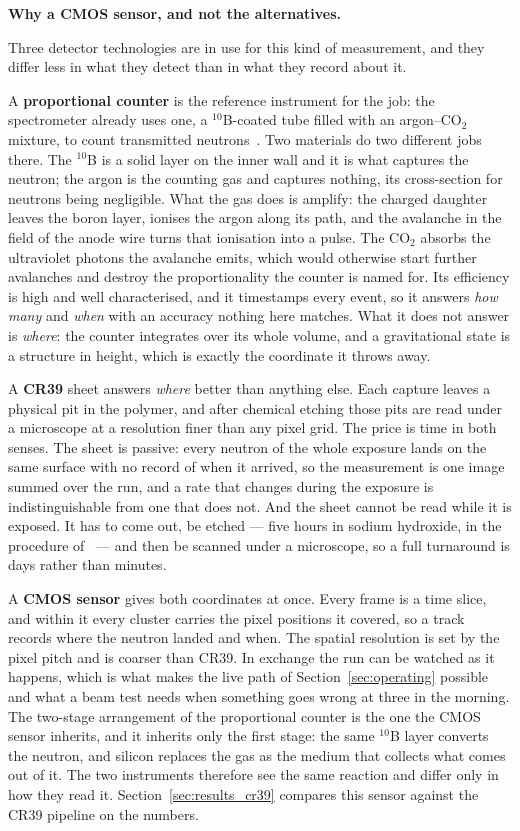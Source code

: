 \documentclass[a4paper,headsepline,oneside,11pt]{scrartcl}
\begin{document}
\vspace{0.5em}
\textbf{Why a CMOS sensor, and not the alternatives.}

Three detector technologies are in use for this kind of measurement, and they
differ less in what they detect than in what they record about it.

A \textbf{proportional counter} is the reference instrument for the job: the
spectrometer already uses one, a $^{10}$B-coated tube filled with an
argon--CO$_2$ mixture, to count transmitted
neutrons~\cite{Jenke2013detectors}. Two materials do two different jobs there.
The $^{10}$B is a solid layer on the inner wall and it is what captures the
neutron; the argon is the counting gas and captures nothing, its cross-section
for neutrons being negligible. What the gas does is amplify: the charged
daughter leaves the boron layer, ionises the argon along its path, and the
avalanche in the field of the anode wire turns that ionisation into a pulse. The
CO$_2$ absorbs the ultraviolet photons the avalanche emits, which would
otherwise start further avalanches and destroy the proportionality the counter
is named for. Its efficiency is high and
well characterised, and it timestamps every event, so it answers \emph{how many}
and \emph{when} with an accuracy nothing here matches. What it does not answer
is \emph{where}: the counter integrates over its whole volume, and a
gravitational state is a structure in height, which is exactly the coordinate it
throws away.

A \textbf{CR39} sheet answers \emph{where} better than anything else. Each
capture leaves a physical pit in the polymer, and after chemical etching those
pits are read under a microscope at a resolution finer than any pixel grid.
The price is time in both senses. The sheet is passive: every neutron of the
whole exposure lands on the same surface with no record of when it arrived, so
the measurement is one image summed over the run, and a rate that changes during
the exposure is indistinguishable from one that does not. And the sheet cannot
be read while it is exposed. It has to come out, be etched --- five hours in
sodium hydroxide, in the procedure of~\cite{Filter2018} --- and then be scanned
under a microscope, so a full turnaround is days rather than minutes.

A \textbf{CMOS sensor} gives both coordinates at once. Every frame is a time
slice, and within it every cluster carries the pixel positions it covered, so a
track records where the neutron landed and when. The spatial resolution is set
by the pixel pitch and is coarser than CR39. In exchange the run can be watched
as it happens, which is what makes the live path of
Section~\ref{sec:operating} possible and what a beam test needs when something
goes wrong at three in the morning. The two-stage arrangement of the
proportional counter is the one the CMOS sensor inherits, and it inherits only
the first stage: the same $^{10}$B layer converts the neutron, and silicon replaces the gas
as the medium that collects what comes out of it. The two instruments therefore
see the same reaction and differ only in how they read it.
Section~\ref{sec:results_cr39} compares this
sensor against the CR39 pipeline on the numbers.
\end{document}
